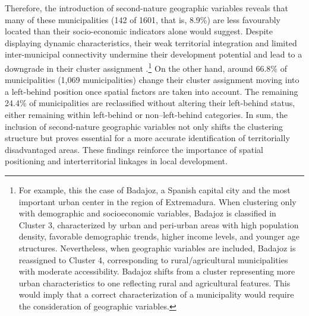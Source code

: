\documentclass[a4paper,11pt,oneside]{article}
\begin{document}
Therefore, the introduction of second-nature geographic variables reveals that many of these municipalities (142 of 1601, that is, 8.9\%) are less favourably located than their socio-economic indicators alone would suggest. Despite displaying dynamic characteristics, their weak territorial integration and limited inter-municipal connectivity undermine their development potential and lead to a downgrade in their cluster assignment \citep{torre2014regional}.\footnote{For example, this the case of Badajoz, a Spanish capital city and the most important urban center in the region of Extremadura. When clustering only with demographic and socioeconomic variables, Badajoz is classified in Cluster 3, characterized by urban and peri-urban areas with high population density, favorable demographic trends, higher income levels, and younger age structures. Nevertheless, when geographic variables are included, Badajoz is reassigned to Cluster 4, corresponding to rural/agricultural municipalities with moderate accessibility. Badajoz shifts from a cluster representing more urban characteristics to one reflecting rural and agricultural features. This would imply that a correct characterization of a municipality would require the consideration of geographic variables.} %
 On the other hand, around 66.8\% of municipalities (1,069 municipalities) change their cluster assignment moving into a left-behind position once spatial factors are taken into account. The remaining 24.4\% of municipalities are reclassified without altering their left-behind status, either remaining within left-behind or non–left-behind categories. In sum, the inclusion of second-nature geographic variables not only shifts the clustering structure but proves essential for a more accurate identification of territorially disadvantaged areas. These findings reinforce the importance of spatial positioning and interterritorial linkages in local development.
\end{document}
